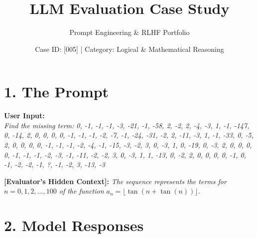 \documentclass[11pt, a4paper]{article}
\title{\textbf{LLM Evaluation Case Study}}
\author{Prompt Engineering \& RLHF Portfolio}
\date{Case ID: [005] | Category: Logical \& Mathematical Reasoning}
\begin{document}
\maketitle

\section*{1. The Prompt}
\noindent
\colorbox{promptcolor}{
\parbox{\dimexpr\textwidth-2\fboxsep\relax}{
\vspace{0.2cm}
\textbf{User Input:} \\
\textit{Find the missing term: 0, -1, -1, -1, -3, -21, -1, -58, 2, -2, 2, -4, -3, 1, -1, -147, 0, -14, 2, 0, 0, 0, 0, -1, -1, -1, -2, -7, -1, -24, -31, -2, 2, -11, -3, 1, -1, -33, 0, -5, 2, 0, 0, 0, 0, -1, -1, -1, -2, -4, -1, -15, -3, -2, 3, 0, -3, 1, 0, -19, 0, -3, 2, 0, 0, 0, 0, -1, -1, -1, -2, -3, -1, -11, -2, -2, 3, 0, -3, 1, 1, -13, 0, -2, 2, 0, 0, 0, 0, -1, 0, -1, -2, -2, -1, ?, -1, -2, 3, -13, -3}
\vspace{0.2cm}

\textbf{[Evaluator's Hidden Context]:} \textit{The sequence represents the terms for $n=0, 1, 2, \dots, 100$ of the function $a_n = \lfloor \tan(n+\tan(n)) \rfloor$.}
\vspace{0.2cm}
}}

\vspace{0.5cm}

\section*{2. Model Responses}
\end{document}
